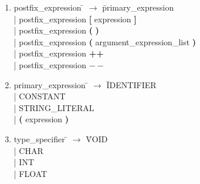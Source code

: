 \documentclass[12pt]{article}
\begin{document}
\begin{enumerate}
%

\item \begin{tabbing} postfix{\_}expression \= $\to$ \= primary{\_}expression \\
	\> | \> postfix{\_}expression \textbf{[} expression \textbf{]} \\
	\> | \> postfix{\_}expression \textbf{(} \textbf{)} \\
	\> | \> postfix{\_}expression \textbf{(} argument{\_}expression{\_}list \textbf{)} \\
	\> | \> postfix{\_}expression \textbf{++} \\
	\> | \> postfix{\_}expression \textbf{$--$}
\end{tabbing}

\item \begin{tabbing} primary{\_}expression \= $\to$ \= IDENTIFIER \\
	\> | \> CONSTANT \\
	\> | \> STRING{\_}LITERAL \\
	\> | \> \textbf{(} expression \textbf{)}
\end{tabbing}

\item \begin{tabbing} type{\_}specifier \= $\to$ \= VOID \\
	\> | \> CHAR \\
	\> | \> INT \\
	\> | \> FLOAT
\end{tabbing}


\end{enumerate}
\normalsize
\end{document}
